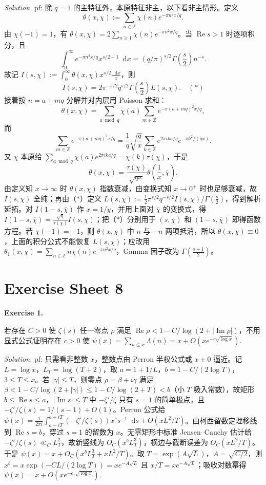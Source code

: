 \documentclass[
	colors = true,
	geometry = b5,
	fontsetup = font-setup-overleaf.tex,
	titlesetup = titles-setup.tex
]{AJbook}
\newenvironment{sheetexercise}[1]{%
	\par\medskip
	\noindent\textbf{Exercise #1.}\enspace
}{%
	\par\smallskip
}
\newenvironment{solution}{%
	\par\smallskip
	\noindent\textit{Solution.}\enspace
}{%
	\par\smallskip
}
\providecommand{\dd}{\mathop{}\!\mathrm d}
\begin{document}
\begin{solution}pf: 除 $q=1$ 的主特征外，本原特征非主，以下看非主情形。定义
\[
	\theta(x,\chi):=\sum_{n\in\mathbb Z}\chi(n)e^{-\pi n^2x/q}.
\]
由 $\chi(-1)=1$，有 $\theta(x,\chi)=2\sum_{n\geq1}\chi(n)e^{-\pi n^2x/q}$。当 $\operatorname{Re}s>1$ 时逐项积分，且
\[
	\int_0^\infty e^{-\pi n^2x/q}x^{s/2-1}\dd x
	=(q/\pi)^{s/2}\Gamma(\frac s2)n^{-s}.
\]
故记 $I(s,\chi):=\int_0^\infty\theta(x,\chi)x^{s/2}\frac{\dd x}{x}$，则
\[
	I(s,\chi)=2\pi^{-s/2}q^{s/2}\Gamma(\frac s2)L(s,\chi). \quad (*)
\]
接着按 $n=a+mq$ 分解并对内层用 Poisson 求和：
\[
	\theta(x,\chi)=\sum_{a\bmod q}\chi(a)\sum_{m\in\mathbb Z}e^{-\pi(a+mq)^2x/q},
\]
而
\[
	\sum_{m\in\mathbb Z}e^{-\pi(a+mq)^2x/q}
	=\frac1q\sqrt{\frac qx}\sum_{k\in\mathbb Z}e^{2\pi ika/q}e^{-\pi k^2/(qx)}.
\]
又 $\chi$ 本原给 $\sum_{a\bmod q}\chi(a)e^{2\pi ika/q}=\overline\chi(k)\tau(\chi)$，于是
\[
	\theta(x,\chi)=\frac{\tau(\chi)}{\sqrt{qx}}\theta(\frac1x,\overline\chi).
\]
由定义知 $x\to\infty$ 时 $\theta(x,\chi)$ 指数衰减，由变换式知 $x\to0^+$ 时也足够衰减，故 $I(s,\chi)$ 全纯；再由（$*$）定义 $L(s,\chi):=\frac12\pi^{s/2}q^{-s/2}I(s,\chi)/\Gamma(\frac s2)$，得到解析延拓。对 $I(1-s,\overline\chi)$ 作 $x=1/y$，并用上面对 $\overline\chi$ 的变换式，得 $I(1-s,\overline\chi)=\frac{\sqrt q}{\tau(\chi)}I(s,\chi)$；把（$*$）分别用于 $(s,\chi)$ 和 $(1-s,\overline\chi)$ 即得函数方程。若 $\chi(-1)=-1$，则 $\theta(x,\chi)$ 中 $n$ 与 $-n$ 两项抵消，所以 $\theta(x,\chi)\equiv0$，上面的积分公式不能恢复 $L(s,\chi)$；应改用 $\theta_1(x,\chi)=\sum_{n\in\mathbb Z}n\chi(n)e^{-\pi n^2x/q}$，Gamma 因子改为 $\Gamma(\frac{s+1}{2})$。\end{solution}
\chapter{Exercise Sheet 8}
\begin{sheetexercise}{1}
若存在 $C>0$ 使 $\zeta(s)$ 任一零点 $\rho$ 满足 $\operatorname{Re}\rho<1-C/\log(2+|\operatorname{Im}\rho|)$，不用显式公式证明存在 $c>0$ 使 $\psi(x)=\sum_{n\leq x}\Lambda(n)=x+O(xe^{-c\sqrt{\log x}})$.
\end{sheetexercise}
\begin{solution}pf: 只需看非整数 $x$，整数点由 Perron 半权公式或 $x\pm0$ 逼近。记 $L=\log x$，$L_T=\log(T+2)$，取 $a=1+1/L$，$b=1-C/(2\log T)$，$3\leq T\leq x$。若 $|\gamma|\leq T$，则零点 $\rho=\beta+i\gamma$ 满足 $\beta<1-C/\log(2+|\gamma|)\leq1-C/\log(2+T)<b$（小 $T$ 吸入常数），故矩形 $b\leq\operatorname{Re}s\leq a$，$|\operatorname{Im}s|\leq T$ 中 $-\zeta'/\zeta$ 只有 $s=1$ 的简单极点，且 $-\zeta'/\zeta(s)=1/(s-1)+O(1)$。Perron 公式给 $\psi(x)=\frac1{2\pi i}\int_{a-iT}^{a+iT}(-\zeta'/\zeta(s))x^s s^{-1}\dd s+O(xL^2/T)$。由柯西留数定理移线到 $\operatorname{Re}s=b$，穿过 $s=1$ 的留数为 $x$。无零矩形中标准 Jensen--Cauchy 估计给 $-\zeta'/\zeta(s)\ll_C L_T^2$，故新竖线为 $O_C(x^bL_T^3)$，横边与截断误差为 $O_C(xL^2/T)$。于是 $\psi(x)=x+O_C(x^bL_T^3+xL^2/T)$。取 $T=\exp(A\sqrt L)$，$A=\sqrt{C/2}$，则 $x^b=x\exp(-CL/(2\log T))=xe^{-A\sqrt L}$ 且 $x/T=xe^{-A\sqrt L}$；吸收对数幂得 $\psi(x)=x+O(xe^{-c_1\sqrt{\log x}})$.\end{solution}
\end{document}
